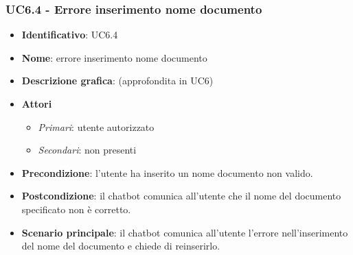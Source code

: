 \subsubsection{UC6.4 - Errore inserimento nome documento}
\begin{itemize}
    \item \textbf{Identificativo}: UC6.4
    \item \textbf{Nome}: errore inserimento nome documento
    \item \textbf{Descrizione grafica}: (approfondita in UC6)
    \item \textbf{Attori}
 \begin{itemize} 
    \item \textit{Primari}: utente autorizzato
    \item \textit{Secondari}: non presenti
 \end{itemize}
 \item \textbf{Precondizione}: l'utente ha inserito un nome documento non valido.
 \item \textbf{Postcondizione}:  il chatbot comunica all'utente che il nome del documento specificato non è corretto.
 \item \textbf{Scenario principale}: il chatbot comunica all'utente l'errore nell'inserimento del nome del documento e chiede di reinserirlo.
\end{itemize}
\newpage